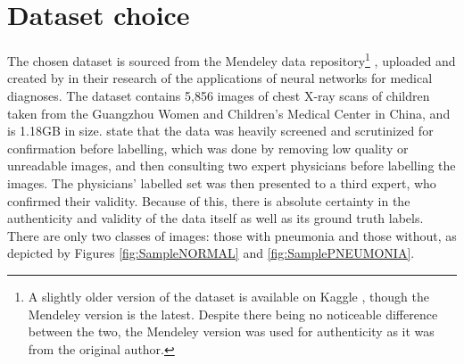 \documentclass[12pt]{report}
\begin{document}
\section{Dataset choice}
The chosen dataset is sourced from the Mendeley data repository\footnote{A slightly older version of the dataset is available on Kaggle \autocite{mooneyChestXRayImages2018}, though the Mendeley version is the latest.
Despite there being no noticeable difference between the two, the Mendeley version was used for authenticity as it was from the original author.} \autocite{mendeleydataLargeDatasetLabeled}, uploaded and created by  
\textcite[p.1127]{kermanyIdentifyingMedicalDiagnoses2018} in their research of the applications of neural networks for medical diagnoses.
The dataset contains 5,856 images of chest X-ray scans of children taken from the
Guangzhou Women and Children's Medical Center in China, and is 1.18GB in size. \textcite[p.e1]{kermanyIdentifyingMedicalDiagnoses2018} 
state that the data was heavily screened and scrutinized for confirmation before labelling, which was done by removing low quality or unreadable images,
and then consulting two expert physicians before labelling the images. The physicians' labelled set was then presented to a third expert, 
who confirmed their validity. Because of this, there is absolute certainty in the authenticity and validity of the data itself as well as its 
ground truth labels.
There are only two classes of images: those with 
pneumonia and those without, as depicted by Figures \ref{fig:SampleNORMAL} and \ref{fig:SamplePNEUMONIA}.
\end{document}
